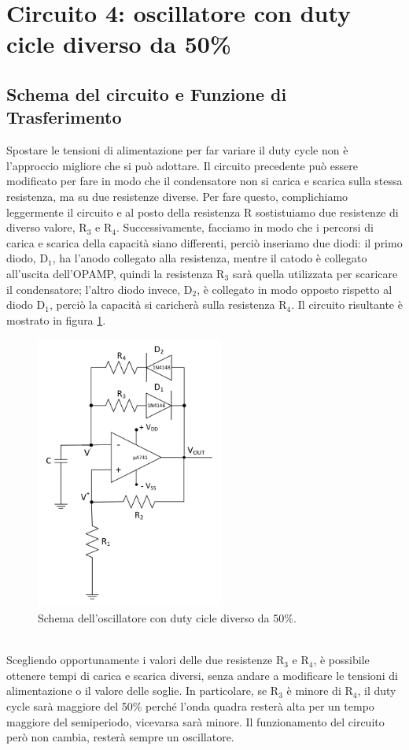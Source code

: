 \documentclass{report}
\begin{document}
\section{Circuito 4: oscillatore con duty cicle diverso da 50\%}
\subsection{Schema del circuito e Funzione di Trasferimento}
Spostare le tensioni di alimentazione per far variare il duty cycle non è l'approccio migliore che si può adottare. Il circuito precedente può essere modificato per fare in modo che il condensatore non si carica e scarica sulla stessa resistenza, ma su due resistenze diverse. Per fare questo, complichiamo leggermente il circuito e al posto della resistenza $\mathrm{R}$ sostistuiamo due resistenze di diverso valore, $\mathrm{R_3}$ e $\mathrm{R_4}$. Successivamente, facciamo in modo che i percorsi di carica e scarica della capacità siano differenti, perciò inseriamo due diodi: il primo diodo, $\mathrm{D_1}$, ha l'anodo collegato alla resistenza, mentre il catodo è collegato all'uscita dell'OPAMP, quindi la resistenza $\mathrm{R_3}$ sarà quella utilizzata per scaricare il condensatore; l'altro diodo invece, $\mathrm{D_2}$, è collegato in modo opposto rispetto al diodo $\mathrm{D_1}$, perciò la capacità si caricherà sulla resistenza $\mathrm{R_4}$. Il circuito risultante è mostrato in figura \ref{figura:schema4}.
\begin{figure}[h!]
	\centering
	\includegraphics[height=9cm]{immagini/schema4}
	\caption{Schema dell'oscillatore con duty cicle diverso da 50\%.}
	\label{figura:schema4}
\end{figure}
\\Scegliendo opportunamente i valori delle due resistenze $\mathrm{R_3}$ e $\mathrm{R_4}$, è possibile ottenere tempi di carica e scarica diversi, senza andare a modificare le tensioni di alimentazione o il valore delle soglie. In particolare, se $\mathrm{R_3}$ è minore di $\mathrm{R_4}$, il duty cycle sarà maggiore del 50\% perché l'onda quadra resterà alta per un tempo maggiore del semiperiodo, vicevarsa sarà minore.  Il funzionamento del circuito però non cambia, resterà sempre un oscillatore. 
\end{document}
